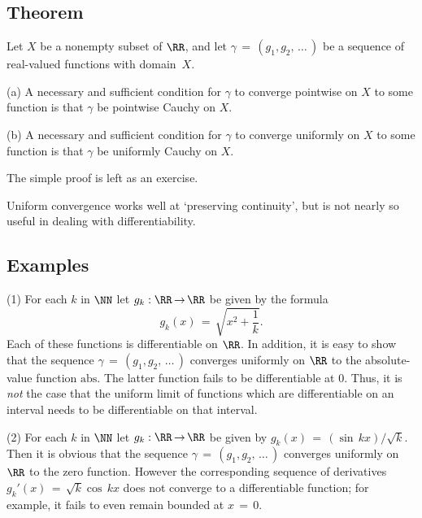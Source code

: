             \subsection{\small{\bf Theorem}}
            \label{ThmF05.70}

\V

        Let $X$ be a nonempty subset of ${\RR}$, and let ${\gamma} \,=\, (g_{1},g_{2},\,{\ldots}\,)$ be a sequence of real-valued functions with domain~$X$.

\V

        (a) A necessary and sufficient condition for ${\gamma}$ to converge pointwise on $X$ to some function is that ${\gamma}$ be pointwise Cauchy on $X$.

\V

        (b) A necessary and sufficient condition for ${\gamma}$ to converge uniformly on $X$ to some function is that ${\gamma}$ be uniformly Cauchy on $X$.

\V

        The simple proof is left as an exercise.

\V
\V

        Uniform convergence works well at `preserving continuity', but is not nearly so useful in dealing with differentiability.

\V

            \subsection{\small{\bf Examples}}
            \label{ExampF05.80}

\V

\hspace*{\parindent}(1) For each $k$ in ${\NN}$ let $g_{k}:{\RR} \,{\rightarrow}\, {\RR}$ be given by the formula
        \begin{displaymath}
        g_{k}(x) \,=\, \sqrt{x^{2} + \frac{1}{k}}.
        \end{displaymath}
    Each of these functions is differentiable on ${\RR}$. In addition, it is easy to show that the sequence ${\gamma} \,=\, (g_{1},g_{2},\,{\ldots}\,)$ converges uniformly on ${\RR}$ to the absolute-value function $\mbox{abs}$.
    The latter function fails to be differentiable at $0$. Thus, it is {\em not} the case that the uniform limit of functions which are differentiable on an interval needs to be differentiable on that interval.

\V

        (2) For each $k$ in ${\NN}$ let $g_{k}:{\RR} \,{\rightarrow}\, {\RR}$ be given by $g_{k}(x) \,=\, ({\sin}\,kx)/\sqrt{k}$.
    Then it is obvious that the sequence ${\gamma} \,=\, (g_{1},g_{2},\,{\ldots}\,)$ converges uniformly on ${\RR}$ to the zero function.
    However the corresponding sequence of derivatives $g_{k}'(x) \,=\, \sqrt{k}{\cos}\,kx$ does not converge to a differentiable function;
    for example, it fails to even remain bounded at $x \,=\, 0$.


